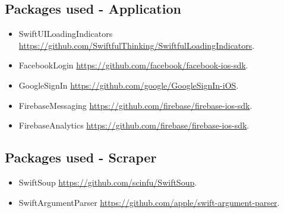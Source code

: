 \subsection{Packages used - Application}
\begin{itemize}
    \item SwiftUILoadingIndicators \href{https://github.com/SwiftfulThinking/SwiftfulLoadingIndicators}{https://github.com/SwiftfulThinking/SwiftfulLoadingIndicators}.
    \item FacebookLogin \href{https://github.com/facebook/facebook-ios-sdk}{https://github.com/facebook/facebook-ios-sdk}.
    \item GoogleSignIn \href{https://github.com/google/GoogleSignIn-iOS}{https://github.com/google/GoogleSignIn-iOS}.
    \item FirebaseMessaging \href{https://github.com/firebase/firebase-ios-sdk}{https://github.com/firebase/firebase-ios-sdk}.
    \item FirebaseAnalytics \href{https://github.com/firebase/firebase-ios-sdk}{https://github.com/firebase/firebase-ios-sdk}.
\end{itemize}

\subsection{Packages used - Scraper}
\begin{itemize}
    \item SwiftSoup \href{https://github.com/scinfu/SwiftSoup}{https://github.com/scinfu/SwiftSoup}.
    \item SwiftArgumentParser \href{https://github.com/apple/swift-argument-parser}{https://github.com/apple/swift-argument-parser}.
\end{itemize}

